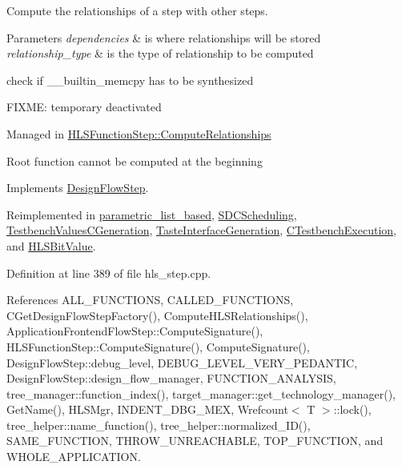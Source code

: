 Compute the relationships of a step with other steps. 


\begin{DoxyParams}{Parameters}
{\em dependencies} & is where relationships will be stored \\
\hline
{\em relationship\+\_\+type} & is the type of relationship to be computed \\
\hline
\end{DoxyParams}
check if \+\_\+\+\_\+builtin\+\_\+memcpy has to be synthesized

F\+I\+X\+ME\+: temporary deactivated

Managed in \hyperlink{classHLSFunctionStep_ab3864e8dbd73b0eabc25f386a0cece54}{H\+L\+S\+Function\+Step\+::\+Compute\+Relationships}

Root function cannot be computed at the beginning 

Implements \hyperlink{classDesignFlowStep_a65bf7bcb603189a7ddcf930c3a9fd7fe}{Design\+Flow\+Step}.



Reimplemented in \hyperlink{classparametric__list__based_af4154cabe85bbd707fc5ee05981e54b0}{parametric\+\_\+list\+\_\+based}, \hyperlink{classSDCScheduling_a28390f2bb68bc997c4827f5dbd240ca5}{S\+D\+C\+Scheduling}, \hyperlink{classTestbenchValuesCGeneration_a3724358a7237a76d6446d9bcb1ffff7c}{Testbench\+Values\+C\+Generation}, \hyperlink{classTasteInterfaceGeneration_aef8be37534a1f17bdfdb6c26ff565fac}{Taste\+Interface\+Generation}, \hyperlink{classCTestbenchExecution_ac3b75ac39514d02be971318c2b9018e9}{C\+Testbench\+Execution}, and \hyperlink{classHLSBitValue_ab1fe55bc2b8b26bd131e9aed874f5e94}{H\+L\+S\+Bit\+Value}.



Definition at line 389 of file hls\+\_\+step.\+cpp.



References A\+L\+L\+\_\+\+F\+U\+N\+C\+T\+I\+O\+NS, C\+A\+L\+L\+E\+D\+\_\+\+F\+U\+N\+C\+T\+I\+O\+NS, C\+Get\+Design\+Flow\+Step\+Factory(), Compute\+H\+L\+S\+Relationships(), Application\+Frontend\+Flow\+Step\+::\+Compute\+Signature(), H\+L\+S\+Function\+Step\+::\+Compute\+Signature(), Compute\+Signature(), Design\+Flow\+Step\+::debug\+\_\+level, D\+E\+B\+U\+G\+\_\+\+L\+E\+V\+E\+L\+\_\+\+V\+E\+R\+Y\+\_\+\+P\+E\+D\+A\+N\+T\+IC, Design\+Flow\+Step\+::design\+\_\+flow\+\_\+manager, F\+U\+N\+C\+T\+I\+O\+N\+\_\+\+A\+N\+A\+L\+Y\+S\+IS, tree\+\_\+manager\+::function\+\_\+index(), target\+\_\+manager\+::get\+\_\+technology\+\_\+manager(), Get\+Name(), H\+L\+S\+Mgr, I\+N\+D\+E\+N\+T\+\_\+\+D\+B\+G\+\_\+\+M\+EX, Wrefcount$<$ T $>$\+::lock(), tree\+\_\+helper\+::name\+\_\+function(), tree\+\_\+helper\+::normalized\+\_\+\+I\+D(), S\+A\+M\+E\+\_\+\+F\+U\+N\+C\+T\+I\+ON, T\+H\+R\+O\+W\+\_\+\+U\+N\+R\+E\+A\+C\+H\+A\+B\+LE, T\+O\+P\+\_\+\+F\+U\+N\+C\+T\+I\+ON, and W\+H\+O\+L\+E\+\_\+\+A\+P\+P\+L\+I\+C\+A\+T\+I\+ON.



